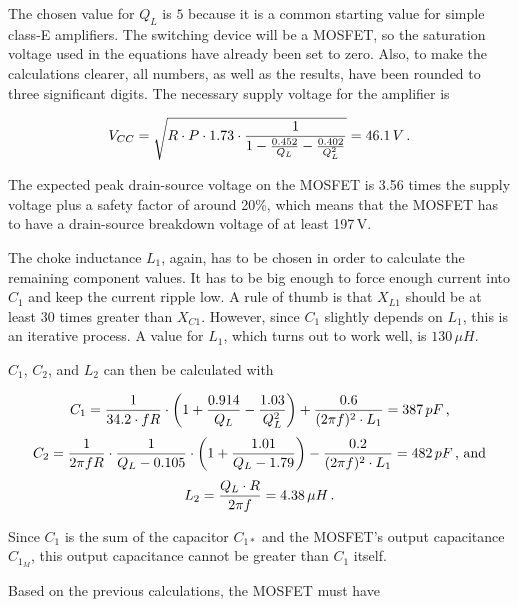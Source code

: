 The chosen value for \(Q_L\) is \(5\) because it is a common starting value for simple class-E amplifiers. The switching device will be a MOSFET, so the saturation voltage used in the equations have already been set to zero. Also, to make the calculations clearer, all numbers, as well as the results, have been rounded to three significant digits. The necessary supply voltage for the amplifier is

\begin{equation*}
    V_{CC} = \sqrt{R \cdot P \cdot 1.73 \cdot \frac{1}{1 - \frac{0.452}{Q_L} - \frac{0.402}{Q_L^2}}} = 46.1\,V\textnormal{\,.}
\end{equation*}

The expected peak drain-source voltage on the MOSFET is 3.56 times the supply voltage plus a safety factor of around 20\%, which means that the MOSFET has to have a drain-source breakdown voltage of at least 197\,V. 

The choke inductance \(L_1\), again, has to be chosen in order to calculate the remaining component values. It has to be big enough to force enough current into \(C_1\) and keep the current ripple low. A rule of thumb is that \(X_{L1}\) should be at least 30 times greater than \(X_{C1}\). However, since \(C_1\) slightly depends on \(L_1\), this is an iterative process. A value for \(L_1\), which turns out to work well, is \(130\,\mu H\). 

\newpage
\(C_1\), \(C_2\), and \(L_2\) can then be calculated with

\begin{equation*}
    C_1 = \frac{1}{34.2\cdot f R} \cdot \left( 1 + \frac{0.914}{Q_L} - \frac{1.03}{Q_L^2} \right) + \frac{0.6}{(2 \pi f)^2  \cdot L_1} = 387\,pF\textnormal{\,,}
\end{equation*}
\begin{equation*}
    C_2 = \frac{1}{2 \pi  f  R} \cdot \frac{1}{Q_L - 0.105} \cdot \left( 1 + \frac{1.01}{Q_L - 1.79} \right) - \frac{0.2}{(2 \pi f)^2 \cdot L_1} = 482\,pF \textnormal{\,, and}
\end{equation*}
\begin{equation*}
    L_2 = \frac{Q_L \cdot R}{2 \pi f} = 4.38\,\mu H\textnormal{\,.}
\end{equation*}
 
Since \(C_1\) is the sum of the capacitor \(C_{1*}\) and the MOSFET's output capacitance \(C_{1_M}\), %
this output capacitance cannot be greater than \(C_1\) itself.

Based on the previous calculations, the MOSFET must have

